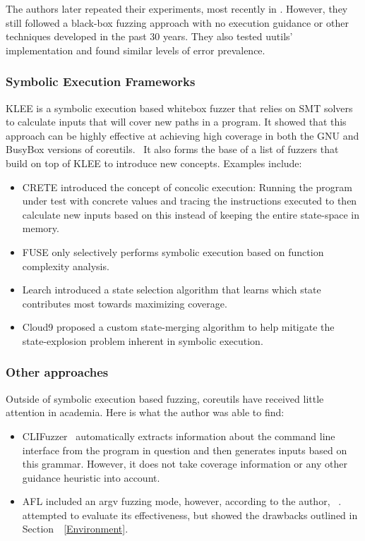 \documentclass{article}
\let\savedCite=\cite
\renewcommand{\cite}{\unskip~\savedCite}
\let\savedRef=\ref
\renewcommand{\ref}{\unskip~\savedRef}
\begin{document}
\begin{multicols}{2}
    The authors later repeated their experiments, most recently in . However, they still followed a black-box fuzzing approach with no execution guidance or other techniques developed in the past 30 years. They also tested uutils' implementation and found similar levels of error prevalence.\cite{UNIXRevisited}

    \subsubsection{Symbolic Execution Frameworks}

    KLEE is a symbolic execution based whitebox fuzzer that relies on SMT solvers to calculate inputs that will cover new paths in a program. It showed that this approach can be highly effective at achieving high coverage in both the GNU and BusyBox versions of coreutils.\cite{KLEE} It also forms the base of a list of fuzzers that build on top of KLEE to introduce new concepts. Examples include:

    \begin{itemize}
        \item CRETE introduced the concept of concolic execution: Running the program under test with concrete values and tracing the instructions executed to then calculate new inputs based on this instead of keeping the entire state-space in memory.\cite{CRETE}
        \item FUSE only selectively performs symbolic execution based on function complexity analysis.\cite{FUSE}
        \item Learch introduced a state selection algorithm that learns which state contributes most towards maximizing coverage.\cite{Learch}
        \item Cloud9 proposed a custom state-merging algorithm to help mitigate the state-explosion problem inherent in symbolic execution.\cite{Cloud9}
    \end{itemize}

    \subsubsection{Other approaches}

    Outside of symbolic execution based fuzzing, coreutils have received little attention in academia. Here is what the author was able to find:

    \begin{itemize}
        \item CLIFuzzer\cite{CLIFuzzer} automatically extracts information about the command line interface from the program in question and then generates inputs based on this grammar. However, it does not take coverage information or any other guidance heuristic into account.
        \item AFL included an argv fuzzing mode, however, according to the author, \cite{AFLPlusPlusargv}. \citeauthor{AFLCoreutils} attempted to evaluate its effectiveness, but showed the drawbacks outlined in Section~\ref{Environment}.\cite{AFLCoreutils}
    \end{itemize}


\end{multicols}
\end{document}
